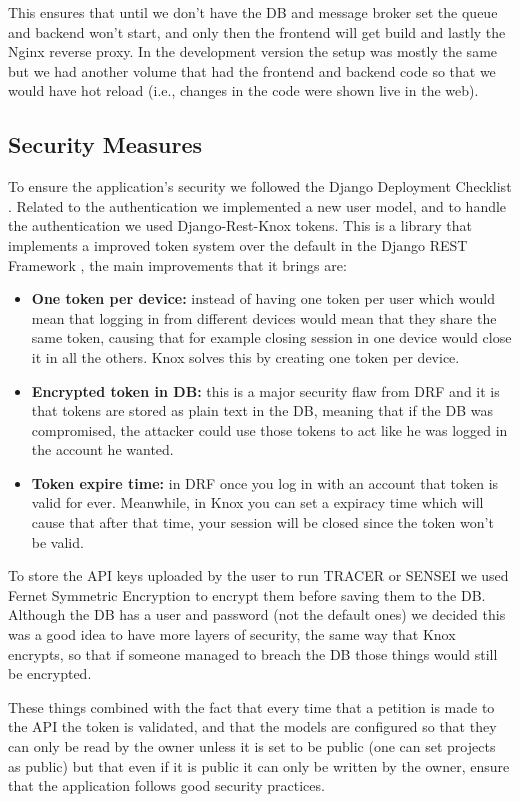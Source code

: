 This ensures that until we don't have the \ac{DB} and message broker set
the queue and backend won't start,
and only then the frontend will get build
and lastly the Nginx reverse proxy.
In the development version the setup was mostly the same
but we had another volume that had the frontend and backend code
so that we would have hot reload (i.e., changes in the code were shown live in the web).

\subsection{Security Measures}

To ensure the application's security we followed the Django Deployment Checklist \autocite{DeploymentChecklistDjango}.
Related to the authentication we implemented a new user model,
and to handle the authentication we used Django-Rest-Knox \autocite{DjangoRestKnox} tokens.
This is a library that implements a improved token system over the default in the Django REST Framework \autocite{DjangoRESTFramework},
the main improvements that it brings are:
\begin{itemize}
  \item \textbf{One token per device:}
    instead of having one token per user
    which would mean that logging in from different devices
    would mean that they share the same token,
    causing that for example closing session in one device would close it in all the others.
    Knox solves this by creating one token per device.

  \item \textbf{Encrypted token in \ac{DB}:}
    this is a major security flaw from \ac{DRF}
    and it is that tokens are stored as plain text in the \ac{DB},
    meaning that if the \ac{DB} was compromised,
    the attacker could use those tokens to act like he was logged in the account he wanted.

  \item \textbf{Token expire time:}
    in \ac{DRF} once you log in with an account that token is valid for ever.
    Meanwhile, in Knox you can set a expiracy time which will cause that after that time,
    your session will be closed since the token won't be valid.
\end{itemize}

To store the \ac{API} keys uploaded by the user to run \ac{TRACER} or SENSEI
we used Fernet Symmetric Encryption \autocite{FernetSymmetricEncryption}
to encrypt them before saving them to the \ac{DB}.
Although the \ac{DB} has a user and password (not the default ones)
we decided this was a good idea to have more layers of security,
the same way that Knox encrypts, so that if someone managed to breach the \ac{DB}
those things would still be encrypted.

These things combined with the fact that
every time that a petition is made to the \ac{API} the token is validated,
and that the models are configured so that they can only be
read by the owner unless it is set to be public (one can set projects as public)
but that even if it is public it can only be written by the owner,
ensure that the application follows good security practices.
